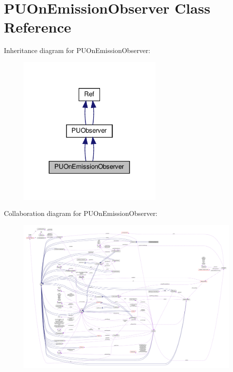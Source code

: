 \hypertarget{classPUOnEmissionObserver}{}\section{P\+U\+On\+Emission\+Observer Class Reference}
\label{classPUOnEmissionObserver}


Inheritance diagram for P\+U\+On\+Emission\+Observer\+:
\nopagebreak
\begin{figure}[H]
\begin{center}
\leavevmode
\includegraphics[width=204pt]{classPUOnEmissionObserver__inherit__graph}
\end{center}
\end{figure}


Collaboration diagram for P\+U\+On\+Emission\+Observer\+:
\nopagebreak
\begin{figure}[H]
\begin{center}
\leavevmode
\includegraphics[width=350pt]{classPUOnEmissionObserver__coll__graph}
\end{center}
\end{figure}
